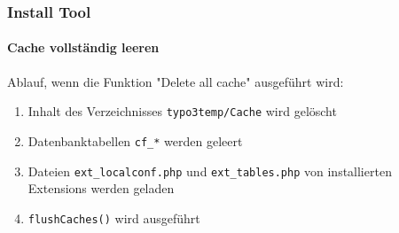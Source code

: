 
\begin{frame}[fragile]
	\frametitle{Install Tool}
	\framesubtitle{Cache vollständig leeren}

	Ablauf, wenn die Funktion "Delete all cache" ausgeführt wird:

	\begin{enumerate}
		\item Inhalt des Verzeichnisses \texttt{typo3temp/Cache} wird gelöscht
		\item Datenbanktabellen \texttt{cf\_*} werden geleert
		\item Dateien \texttt{ext\_localconf.php} und \texttt{ext\_tables.php}\newline
			von installierten Extensions werden geladen
		\item \texttt{flushCaches()} wird ausgeführt
	\end{enumerate}

\end{frame}


